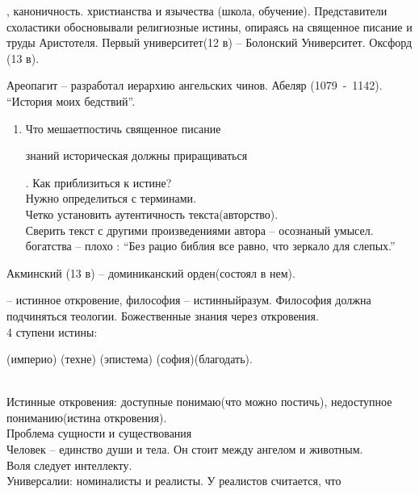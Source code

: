 \documentclass[a4paper,12pt]{report} %
\begin{document}
\begin{itemize}
\begin{itemize}
  , каноничность.
   христианства и язычества
  (школа, обучение). Представители схоластики
    обосновывали религиозные истины, опираясь на священное писание и
    труды Аристотеля. Первый университет(12 в) -- Болонский
    Университет. Оксфорд (13 в).
  \end{itemize}
  \begin{enumerate}
   Ареопагит -- разработал иерархию ангельских чинов.
   Абеляр (1079~-~1142). ``История моих бедствий''.
    \begin{enumerate}
    . Понимай, чтобы верить.
    \item Что мешаетпостичь священное писание
      \begin{enumerate}
       знаний историческая
       должны приращиваться
      \end{enumerate}
    . Как приблизиться к истине? 
      \\Нужно определиться с терминами. 
      \\Четко установить аутентичность текста(авторство).
      \\Сверить текст с другими произведениями автора
     -- осознаный умысел.
     богатства -- плохо
    : ``Без рацио библия все равно, что зеркало для слепых.''
    \end{enumerate}
   Акминский (13 в) -- доминиканский орден(состоял в нем).
    \begin{enumerate}
     -- истинное откровение, философия -- истинныйразум. Философия
      должна подчиняться теологии. Божественные знания через откровения. 
      \\4 ступени истины:
      \begin{enumerate}
      (империо) 
      (техне)
      (эпистема)
      (софия)(благодать).
      \end{enumerate}
      \\Истинные откровения: доступные понимаю(что можно постичь),
      недоступное пониманию(истина откровения).
      \\Проблема сущности и существования
      \\Человек -- единство души и тела. Он стоит между ангелом и животным.
      \\Воля следует интеллекту.
      \\Универсалии: номиналисты и реалисты. У реалистов считается, что

\end{enumerate}
\end{enumerate}
\end{itemize}
\end{document}
